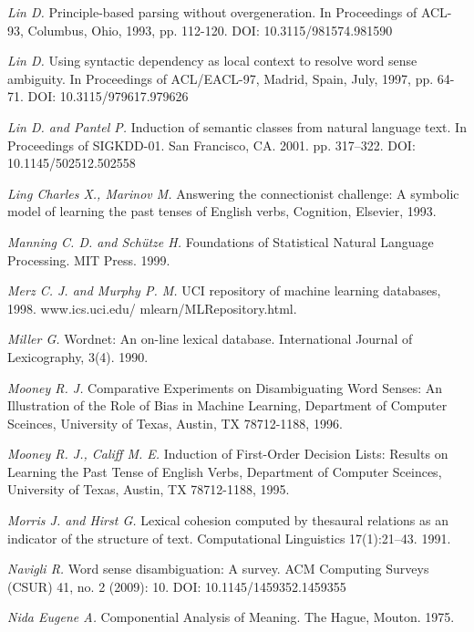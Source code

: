 \documentclass{article}
\begin{document}
\begin{articletext}
\begin{thebibliography}{9}
\textit{Lin D. }Principle-based parsing without overgeneration. In Proceedings of ACL-93, Columbus, Ohio, 1993, pp. 112-120. DOI: 10.3115/981574.981590

\textit{Lin D. }Using syntactic dependency as local context to resolve word sense ambiguity. In Proceedings of ACL/EACL-97, Madrid, Spain, July, 1997, pp. 64-71. DOI: 10.3115/979617.979626


\textit{Lin D. and Pantel P. }Induction of semantic classes from natural language text. In Proceedings of SIGKDD-01. San Francisco, CA. 2001. pp. 317–322. DOI: 10.1145/502512.502558  

\textit{Ling Charles X.,  Marinov M. }Answering the connectionist challenge: A symbolic model of learning the past tenses of English verbs,  Cognition, Elsevier, 1993.


\textit{Manning C. D. and  Sch\"utze H. }Foundations of Statistical Natural Language Processing. MIT Press. 1999.

\textit{Merz C. J. and  Murphy P. M. }UCI repository of machine learning databases, 1998. www.ics.uci.edu/ mlearn/MLRepository.html.

\textit{Miller G. }Wordnet: An on-line lexical database. International Journal of Lexicography, 3(4). 1990.

\textit{Mooney R. J. }Comparative Experiments on Disambiguating Word Senses:
An Illustration of the Role of Bias in Machine Learning, Department of Computer Sceinces, University of Texas, Austin, TX 78712-1188, 1996.

\textit{Mooney R. J., Califf M. E. }Induction of First-Order Decision Lists: Results on Learning the Past Tense of English Verbs, Department of Computer Sceinces, University of Texas, Austin, TX 78712-1188, 1995.

\textit{Morris J. and  Hirst G. }Lexical cohesion computed by thesaural relations as an indicator of the structure of text. Computational Linguistics 17(1):21–43. 1991. 

\textit{Navigli R. }Word sense disambiguation: A survey. ACM Computing Surveys (CSUR) 41, no. 2 (2009): 10. DOI: 10.1145/1459352.1459355

\textit{Nida Eugene A. }Componential Analysis of Meaning. The Hague, Mouton. 1975.



\end{thebibliography}
\end{articletext}
\end{document}
